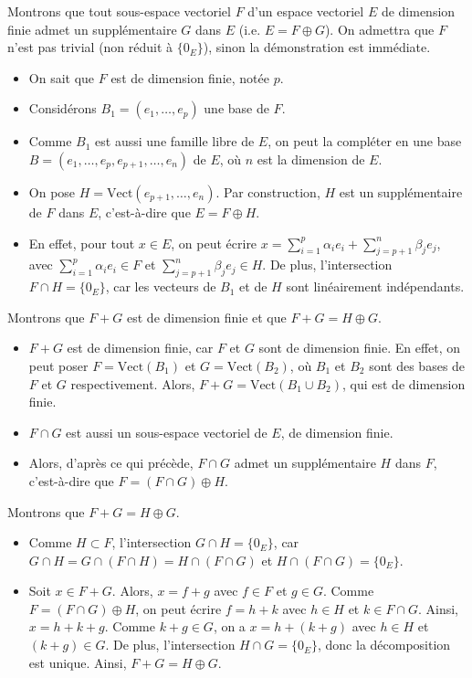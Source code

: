 \documentclass[11pt, a4paper]{article}
\theoremstyle{definition}
\begin{document}
Montrons que tout sous-espace vectoriel $F$ d'un espace vectoriel $E$ de dimension finie admet un supplémentaire $G$ dans $E$ (i.e. $E = F \oplus G$). On admettra que $F$ n'est pas trivial (non réduit à $\{0_E\}$), sinon la démonstration est immédiate.
\begin{itemize}
	\item On sait que $F$ est de dimension finie, notée $p$.
	\item Considérons $B_1 = (e_1, \dots, e_p)$ une base de $F$.
	\item Comme $B_1$ est aussi une famille libre de $E$, on peut la compléter en une base $B = (e_1, \dots, e_p, e_{p+1}, \dots, e_n)$ de $E$, où $n$ est la dimension de $E$.
	\item On pose $H = \text{Vect}(e_{p+1}, \dots, e_n)$. Par construction, $H$ est un supplémentaire de $F$ dans $E$, c'est-à-dire que $E = F \oplus H$.
	\item En effet, pour tout $x \in E$, on peut écrire $x = \sum_{i=1}^p \alpha_i e_i + \sum_{j=p+1}^n \beta_j e_j$, avec $\sum_{i=1}^p \alpha_i e_i \in F$ et $\sum_{j=p+1}^n \beta_j e_j \in H$. De plus, l'intersection $F \cap H = \{0_E\}$, car les vecteurs de $B_1$ et de $H$ sont linéairement indépendants.
\end{itemize}
Montrons que $F+G$ est de dimension finie et que $F+G = H \oplus G$.
\begin{itemize}
	\item $F+G$ est de dimension finie, car $F$ et $G$ sont de dimension finie. En effet, on peut poser $F = \text{Vect}(B_1)$ et $G = \text{Vect}(B_2)$, où $B_1$ et $B_2$ sont des bases de $F$ et $G$ respectivement. Alors, $F+G = \text{Vect}(B_1 \cup B_2)$, qui est de dimension finie.
	\item $F \cap G$ est aussi un sous-espace vectoriel de $E$, de dimension finie.
	\item Alors, d'après ce qui précède, $F \cap G$ admet un supplémentaire $H$ dans $F$, c'est-à-dire que $F = (F \cap G) \oplus H$.
\end{itemize}
Montrons que $F+G = H \oplus G$.
\begin{itemize}
	\item Comme $H \subset F$, l'intersection $G \cap H = \{0_E\}$, car $G \cap H = G \cap (F \cap H) = H \cap (F \cap G)$ et $H \cap (F \cap G) = \{0_E\}$.
	\item Soit $x \in F+G$. Alors, $x = f + g$ avec $f \in F$ et $g \in G$. Comme $F = (F \cap G) \oplus H$, on peut écrire $f = h + k$ avec $h \in H$ et $k \in F \cap G$. Ainsi, $x = h + k + g$. Comme $k + g \in G$, on a $x = h + (k + g)$ avec $h \in H$ et $(k + g) \in G$. De plus, l'intersection $H \cap G = \{0_E\}$, donc la décomposition est unique. Ainsi, $F+G = H \oplus G$.
\end{itemize}
\end{document}
